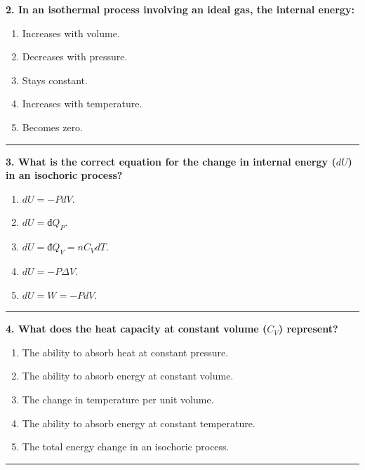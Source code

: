 \documentclass[
  9pt,
]{extbook}
\providecommand{\tightlist}{%
  \setlength{\itemsep}{0pt}\setlength{\parskip}{0pt}}
\theoremstyle{definition}
\theoremstyle{definition}
\theoremstyle{definition}
\theoremstyle{remark}
\begin{document}
\textbf{2. In an isothermal process involving an ideal gas, the internal energy:}

\begin{enumerate}
\def\labelenumi{\alph{enumi}.}
\tightlist
\item
  Increases with volume.
\item
  Decreases with pressure.
\item
  Stays constant.
\item
  Increases with temperature.
\item
  Becomes zero.
\end{enumerate}

\begin{center}\rule{0.5\linewidth}{0.5pt}\end{center}

\textbf{3. What is the correct equation for the change in internal energy (\(dU\)) in an isochoric process?}

\begin{enumerate}
\def\labelenumi{\alph{enumi}.}
\tightlist
\item
  \(dU = -P dV\).
\item
  \(dU = đQ_P\).
\item
  \(dU = đQ_V = nC_V dT\).
\item
  \(dU = -P \Delta V\).
\item
  \(dU = W = -P dV\).
\end{enumerate}

\begin{center}\rule{0.5\linewidth}{0.5pt}\end{center}

\textbf{4. What does the heat capacity at constant volume (\(C_V\)) represent?}

\begin{enumerate}
\def\labelenumi{\alph{enumi}.}
\tightlist
\item
  The ability to absorb heat at constant pressure.
\item
  The ability to absorb energy at constant volume.
\item
  The change in temperature per unit volume.
\item
  The ability to absorb energy at constant temperature.
\item
  The total energy change in an isochoric process.
\end{enumerate}

\begin{center}\rule{0.5\linewidth}{0.5pt}\end{center}
\end{document}
